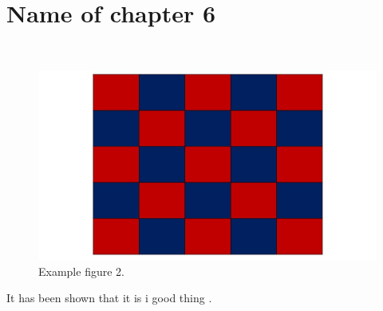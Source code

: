 \documentclass[../main.tex]{subfiles}
\begin{document}
    
    
    \chapter{Name of chapter 6}
    \lipsum[1-2]\\
    
    \begin{figure}[H]
    \centering
    \includegraphics[width=1.0\textwidth]{Figures/example_figure3.JPG}
    \caption{Example figure 2.}
    \label{figexample_figure3}
    \end{figure}
    It has been shown that it is i good thing \citep{example_reference2}. 
    
    \lipsum[1-2]
    
\biblio
\cleardoublepage
\end{document}
